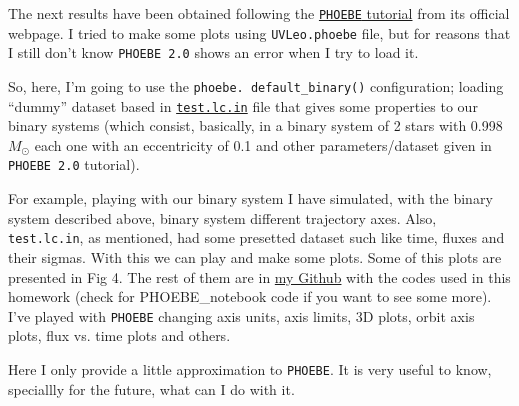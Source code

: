 The next results have been obtained following the \href{phoebe-project.org/docs/2.0/#Tutorials}{\texttt{PHOEBE} tutorial} from its official webpage. I tried to make some plots using \texttt{UVLeo.phoebe} file, but for reasons that I still don't know \texttt{PHOEBE 2.0} shows an error when I try to load it.

So, here, I'm going to use the \texttt{phoebe. default\_binary()} configuration; loading ``dummy'' dataset based in \href{https://raw.githubusercontent.com/phoebe-project/phoebe2-docs/master/tutorials/test.lc.in}{\texttt{test.lc.in}} file that gives some properties to our binary systems (which consist, basically, in a binary system of 2 stars with 0.998 $M_{\odot}$ each one with an eccentricity of 0.1 and other parameters/dataset given in \texttt{PHOEBE 2.0} tutorial).  

For example, playing with our binary system I have simulated, with the binary system described above, binary system different trajectory axes. Also, \texttt{test.lc.in}, as mentioned, had some presetted dataset such like time, fluxes and their sigmas. With this we can play and make some plots. Some of this plots are presented in Fig 4. The rest of them are in \href{https://github.com/Panchitoz1/Estrellas_Variables}{my Github} with the codes used in this homework (check for PHOEBE\_notebook code if you want to see some more). I've played with \texttt{PHOEBE} changing axis units, axis limits, 3D plots, orbit axis plots, flux vs. time plots and others.

Here I only provide a little approximation to  \texttt{PHOEBE}. It is very useful to know, speciallly for the future, what can I do with it.

